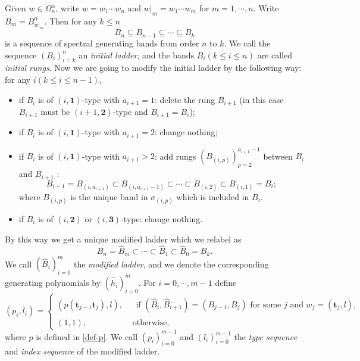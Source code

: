 \documentclass[reqno,11pt,graphicx,]{amsart}
\numberwithin{equation}{section}
\theoremstyle{plain}
\newcommand{\3}{\mathbf{3}}
\begin{document}
	Given $w\in\Omega^{\alpha}_n$, write $w=w_1\cdots w_n$ and $w|_m=w_1\cdots w_m$
	for $m=1,\cdots,n.$ Write $B_m=B^{\alpha}_{w|_m}.$ Then
	for any $k\le n$
	$$
	B_n\subseteq B_{n-1}\subseteq\cdots\subseteq B_{k}
	$$
	is  a sequence of spectral generating bands from order $n$ to $k$. We
	call the sequence $(B_i)_{i=k}^n$ an {\em initial ladder}, and the
	bands $B_i(k\le i\le n)$ are called  {\it initial rungs}. Now we are going
	to modify the initial ladder by the following way: for any $i(k\le
	i\le n-1)$,
	\begin{itemize}
		\item if   $B_i$ is of $(i,\mathbf{1})$-type with $a_{i+1}=1$:  delete the rung
		$B_{i+1}$ (in this case $B_{i+1}$ must be $(i+1,\mathbf{2})$-type and $B_{i+1}=B_i$);
		
		\item if $B_i$ is of $(i,\mathbf{1})$-type with $a_{i+1}=2$: change
		nothing;
		
		\item if $B_i$ is of $(i,\mathbf{1})$-type with $a_{i+1}>2$: add rungs
		$(B_{(i,p)})_{p=2}^{a_{i+1}-1}$ between $B_i$ and $B_{i+1}$ :
		$$B_{i+1}=B_{(i,a_{i+1})}\subset B_{(i,a_{i+1}-1)}\subset\cdots\subset
		B_{(i,2)}\subset B_{(i,1)}=B_i;$$
		where $B_{(i,p)}$ is the unique band in $\sigma_{(i,p)}$ which is included in $B_i$.
		\item if $B_i$ is of $(i,\mathbf{2})$ or $(i,\mathbf{3})$-type: change nothing.
	\end{itemize}
	By this way we get  a unique modified ladder which we relabel as
	$$B_n=\hat{B}_m\subset\cdots\subset\hat{B}_1\subset \hat{B}_{0}=B_{k}.$$
	We call $(\hat{B}_i)_{i=0}^m$ the {\em modified ladder}, and we
	denote the corresponding generating polynomials by
	$(\hat{h}_i)_{i=0}^m$. For $i=0,\cdots,m-1$ define
	\begin{equation}\label{pvalue}
		(p_i,l_i)=
		\begin{cases}
			(p(\mathbf{t}_{j-1}\mathbf{t}_j),l), &
			\begin{array}{l}
				\text{ if }  (\hat B_{i},\hat B_{i+1})=(B_{j-1},B_{j})\text{ for some } j \text{ and } w_j=(\mathbf{t}_j,l),
			\end{array} \\
			(1,1), & \text{  otherwise},
		\end{cases}
	\end{equation}
where $p$ is defined in \eqref{def-p}.	We call $(p_i)_{i=0}^{m-1}$ and $(l_i)_{i=0}^{m-1}$
	the {\it type sequence } and {\it index sequence } of the modified ladder.
	
\end{document}
